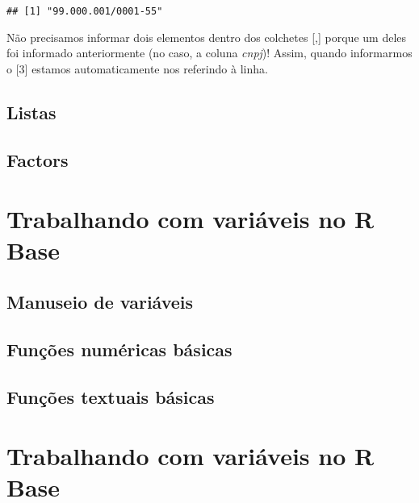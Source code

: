 \documentclass[
]{book}
\begin{document}
\begin{verbatim}
## [1] "99.000.001/0001-55"
\end{verbatim}

Não precisamos informar dois elementos dentro dos colchetes {[},{]} porque um deles foi informado anteriormente (no caso, a coluna \emph{cnpj})! Assim, quando informarmos o {[}3{]} estamos automaticamente nos referindo à linha.

\hypertarget{listas}{%
\section{Listas}\label{listas}}

\hypertarget{factors}{%
\section{Factors}\label{factors}}

\hypertarget{trabalhando-com-variuxe1veis-no-r-base}{%
\chapter{Trabalhando com variáveis no R Base}\label{trabalhando-com-variuxe1veis-no-r-base}}

\hypertarget{manuseio-de-variuxe1veis}{%
\section{Manuseio de variáveis}\label{manuseio-de-variuxe1veis}}

\hypertarget{funuxe7uxf5es-numuxe9ricas-buxe1sicas}{%
\section{Funções numéricas básicas}\label{funuxe7uxf5es-numuxe9ricas-buxe1sicas}}

\hypertarget{funuxe7uxf5es-textuais-buxe1sicas}{%
\section{Funções textuais básicas}\label{funuxe7uxf5es-textuais-buxe1sicas}}

\hypertarget{trabalhando-com-variuxe1veis-no-r-base-1}{%
\chapter{Trabalhando com variáveis no R Base}\label{trabalhando-com-variuxe1veis-no-r-base-1}}
\end{document}
